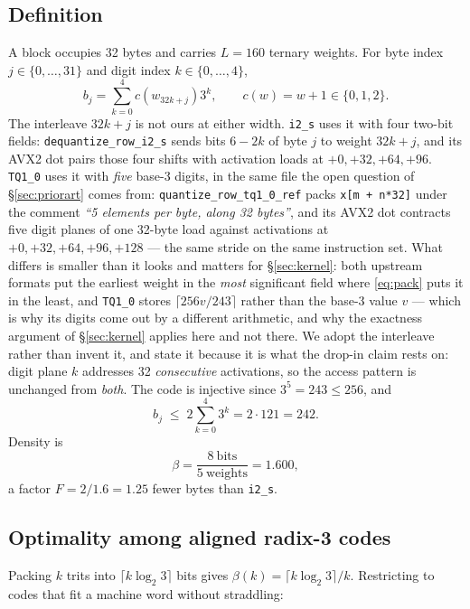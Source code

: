 \documentclass[11pt,a4paper]{article}
\newcommand{\code}[1]{\texttt{#1}}
\begin{document}
\subsection{Definition}
A block occupies 32 bytes and carries $L=160$ ternary weights. For byte index
$j\in\{0,\dots,31\}$ and digit index $k\in\{0,\dots,4\}$,
\begin{equation}
b_{j}=\sum_{k=0}^{4}c\!\left(w_{32k+j}\right)3^{k},
\qquad c(w)=w+1\in\{0,1,2\}.
\label{eq:pack}
\end{equation}
The interleave $32k+j$ is not ours at either width. \code{i2\_s} uses it with
four two-bit fields: \code{dequantize\_row\_i2\_s} sends bits $6-2k$ of byte
$j$ to weight $32k+j$, and its AVX2 dot pairs those four shifts with activation
loads at $+0,+32,+64,+96$. \code{TQ1\_0} uses it with \emph{five} base-3
digits, in the same file the open question of \S\ref{sec:priorart} comes from:
\code{quantize\_row\_tq1\_0\_ref} packs \code{x[m + n*32]} under the comment
\emph{``5 elements per byte, along 32 bytes''}, and its AVX2 dot contracts five
digit planes of one 32-byte load against activations at
$+0,+32,+64,+96,+128$ --- the same stride on the same instruction set. What
differs is smaller than it looks and matters for \S\ref{sec:kernel}: both
upstream formats put the earliest weight in the \emph{most} significant field
where \eqref{eq:pack} puts it in the least, and \code{TQ1\_0} stores
$\lceil 256v/243\rceil$ rather than the base-3 value $v$ --- which is why its
digits come out by a different arithmetic, and why the exactness argument of
\S\ref{sec:kernel} applies here and not there. We adopt the interleave rather
than invent it, and state it because it is what the drop-in claim rests on:
digit plane $k$ addresses 32 \emph{consecutive} activations, so the access
pattern is unchanged from \emph{both}. The code is
injective since $3^{5}=243\le 256$, and
\begin{equation}
b_{j}\;\le\;2\sum_{k=0}^{4}3^{k}=2\cdot 121=242 .
\label{eq:bound242}
\end{equation}
Density is
\begin{equation}
\beta=\frac{8\ \text{bits}}{5\ \text{weights}}=\num{1.600},
\end{equation}
a factor $F=2/\num{1.6}=\num{1.25}$ fewer bytes than \code{i2\_s}.

\subsection{Optimality among aligned radix-3 codes}
Packing $k$ trits into $\lceil k\log_{2}3\rceil$ bits gives
$\beta(k)=\lceil k\log_{2}3\rceil/k$. Restricting to codes that fit a machine
word without straddling:
\end{document}
